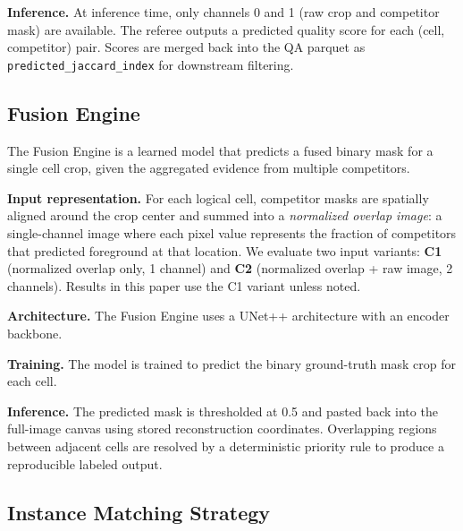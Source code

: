 \textbf{Inference.} At inference time, only channels 0 and 1 (raw crop and competitor mask) are
available. The referee outputs a predicted quality score for each (cell, competitor) pair. Scores
are merged back into the QA parquet as \texttt{predicted\_jaccard\_index} for downstream filtering.

\subsection{Fusion Engine}
\label{sec:fusion_engine}

The Fusion Engine is a learned model that predicts a fused binary mask for a single cell crop,
given the aggregated evidence from multiple competitors.

\textbf{Input representation.} For each logical cell, competitor masks are spatially aligned around
the crop center and summed into a \emph{normalized overlap image}: a single-channel image where
each pixel value represents the fraction of competitors that predicted foreground at that location.
We evaluate two input variants: \textbf{C1} (normalized overlap only, 1 channel) and \textbf{C2}
(normalized overlap + raw image, 2 channels). Results in this paper use the C1 variant unless
noted.

\textbf{Architecture.} The Fusion Engine uses a UNet++ architecture \cite{zhou2018unet++} with an
encoder backbone.

\textbf{Training.} The model is trained to predict the binary ground-truth mask crop for each cell.

\textbf{Inference.} The predicted mask is thresholded at 0.5 and pasted back into the full-image
canvas using stored reconstruction coordinates. Overlapping regions between adjacent cells are
resolved by a deterministic priority rule to produce a reproducible labeled output.

\subsection{Instance Matching Strategy}
\label{sec:instance_matching}

